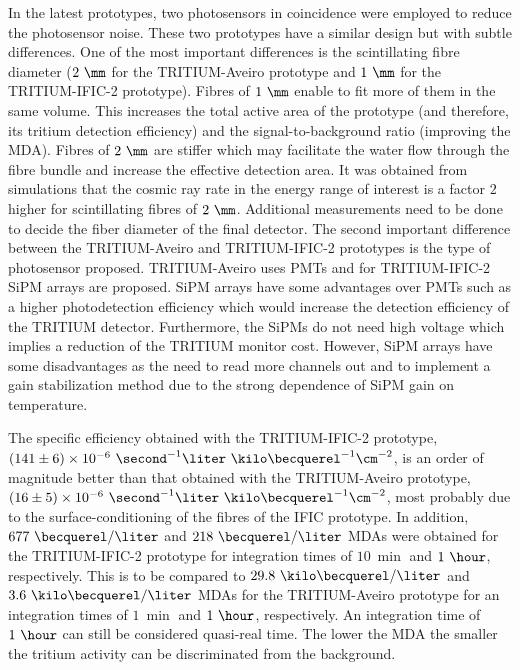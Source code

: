 \begin{enumerate}
In the latest prototypes, two photosensors in coincidence were employed to reduce the photosensor noise. These two prototypes have a similar design but with subtle differences. One of the most important differences is the scintillating fibre diameter ($2~\mm$ for the TRITIUM-Aveiro prototype and $1~\mm$ for the TRITIUM-IFIC-2 prototype). Fibres of $1~\mm$ enable to fit more of them in the same volume. This increases the total active area of the prototype (and therefore, its tritium detection efficiency) and the signal-to-background ratio (improving the MDA). Fibres of $2~\mm$ are stiffer which may facilitate the water flow through the fibre bundle and increase the effective detection area. It was obtained from simulations that the cosmic ray rate in the energy range of interest is a factor $2$ higher for scintillating fibres of $2~\mm$. Additional measurements need to be done to decide the fiber diameter of the final detector. The second important difference between the TRITIUM-Aveiro and TRITIUM-IFIC-2 prototypes is the type of photosensor proposed. TRITIUM-Aveiro uses PMTs and for TRITIUM-IFIC-2 SiPM arrays are proposed. SiPM arrays have some advantages over PMTs such as a higher photodetection efficiency which would increase the detection efficiency of the TRITIUM detector. Furthermore, the SiPMs do not need high voltage which implies a reduction of the TRITIUM monitor cost. However, SiPM arrays have some disadvantages as the need to read more channels out and to implement a gain stabilization method due to the strong dependence of SiPM gain on temperature.

The specific efficiency obtained with the TRITIUM-IFIC-2 prototype, $(141 \pm 6) \times 10^{-6}~ \second^{-1}  \liter ~ \kilo\becquerel^{-1} \cm^{-2}$, is an order of magnitude better than that obtained with the TRITIUM-Aveiro prototype, $(16 \pm 5)\times 10^{-6}~ \second^{-1}  \liter ~ \kilo\becquerel^{-1} \cm^{-2}$, most probably due to the surface-conditioning of the fibres of the IFIC prototype. In addition, $677~\becquerel/\liter$ and $218~\becquerel/\liter$ MDAs were obtained for the TRITIUM-IFIC-2 prototype for integration times of $10~\min$ and $1~\hour$, respectively. This is to be compared to $29.8~\kilo\becquerel/\liter$ and $3.6~\kilo\becquerel/\liter$ MDAs for the TRITIUM-Aveiro prototype for an integration times of $1~\min$ and $1~\hour$, respectively. An integration time of $1~\hour$ can still be considered quasi-real time. The lower the MDA the smaller the tritium activity can be discriminated from the background.


\end{enumerate}
